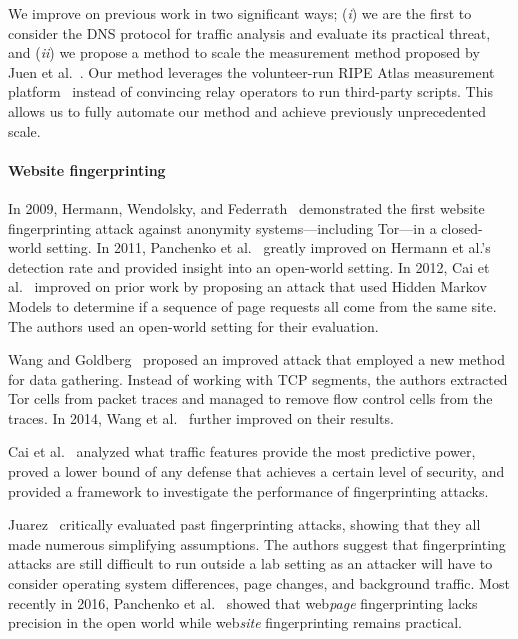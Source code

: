 We improve on previous work in two significant ways; (\emph{i}) we are the
first to consider the DNS protocol for traffic analysis and evaluate its
practical threat, and (\emph{ii}) we propose a method to scale the measurement
method proposed by Juen et al.~\cite{Juen2015a}.  Our method leverages the
volunteer-run RIPE Atlas measurement platform~\cite{atlas} instead of
convincing relay operators to run third-party scripts.  This allows us to fully
automate our method and achieve previously unprecedented scale.

\paragraph{Website fingerprinting}
In 2009, Hermann, Wendolsky, and Federrath~\cite{Hermann2009a} demonstrated the
first website fingerprinting attack against anonymity systems---including
Tor---in a closed-world setting.  In 2011, Panchenko et
al.~\cite{Panchenko2011a} greatly improved on Hermann et al.'s detection rate
and provided insight into an open-world setting.  In 2012, Cai et
al.~\cite{Cai2012a} improved on prior work by proposing an attack that used
Hidden Markov Models to determine if a sequence of page requests all come from
the same site.  The authors used an open-world setting for their evaluation.

Wang and Goldberg~\cite{Wang2013a} proposed an improved attack that employed a
new method for data gathering.  Instead of working with TCP segments, the
authors extracted Tor cells from packet traces and managed to remove flow
control cells from the traces.  In 2014, Wang et al.~\cite{Wang2014a} further
improved on their results.

Cai et al.~\cite{Cai2014b} analyzed what traffic features provide the most
predictive power, proved a lower bound of any defense that achieves a certain
level of security, and provided a framework to investigate the performance of
fingerprinting attacks.

Juarez~\cite{Juarez2014a} critically evaluated past fingerprinting attacks,
showing that they all made numerous simplifying assumptions.  The authors
suggest that fingerprinting attacks are still difficult to run outside a lab
setting as an attacker will have to consider operating system differences, page
changes, and background traffic.  Most recently in 2016, Panchenko et
al.~\cite{Panchenko2016a} showed that web\emph{page} fingerprinting lacks
precision in the open world while web\emph{site} fingerprinting remains
practical.

